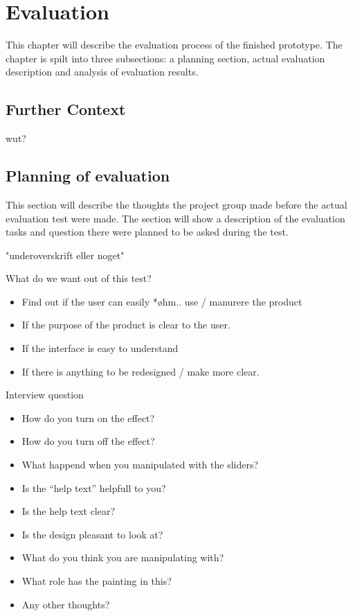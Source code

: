 \chapter{Evaluation}\label{ch:evaluation}
This chapter will describe the evaluation process of the finished prototype. The chapter is spilt into three subsections: a planning section, actual evaluation description and analysis of evaluation results. 

\section{Further Context}\label{sec:furthercontext}
 wut?

\section{Planning of evaluation}
This section will describe the thoughts the project group made before the actual evaluation test were made. The section will show a description of the evaluation tasks and question there were planned to be asked during the test. 

"underoverskrift eller noget" 

What do we want out of this test?

\begin{itemize}
\item Find out if the user can easily *øhm.. use / manurere the product
\item If the purpose of the product is clear to the user.
\item If the interface is easy to understand 
\item If there is anything to be redesigned / make more clear.
\end{itemize}

Interview question 
\begin{itemize}
\item How do you turn on the effect?
\item How do you turn off the effect?
\item What happend when you manipulated with the sliders?
\item Is the “help text” helpfull to you?
\item Is the help text clear?
\item Is the design pleasant to look at?
\item What do you think you are manipulating with?
\item What role has the painting in this?
\item Any other thoughts?
\end{itemize}

